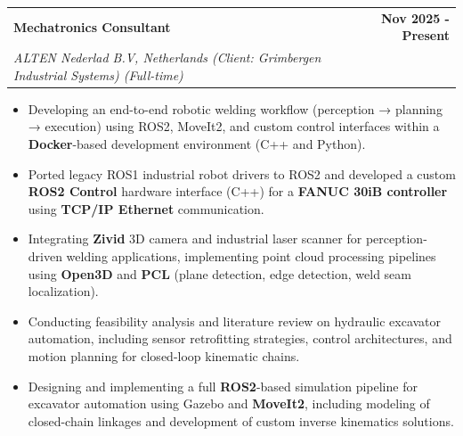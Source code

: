 \documentclass[a4paper,20pt]{article}
\makeatletter
\newcommand{\resumeSubheading}[4]{
  \vspace{-1pt}\item
    \begin{tabular*}{0.97\textwidth}{l@{\extracolsep{\fill}}r}
      \textbf{#1} \small \textit{#4} & #2 \\
      \textit{#3} &  \\
    \end{tabular*}\vspace{-5pt}
}
\newcommand{\resumeSubheading}[5]{ %
  \vspace{-1pt}\item
    \begin{tabular*}{0.97\textwidth}{l@{\extracolsep{\fill}}r}
      \textbf{#1} & #2 \\
      \textit{#3} & \textit{#4} \\
    \end{tabular*} 
    \vspace{-2pt}
    \small #5 %
    \vspace{-5pt}
}
\makeatother
\begin{document}
\vspace{5pt}
    \resumeSubheading
		{Mechatronics Consultant}{\textbf{Nov 2025 - Present}}{ALTEN Nederlad B.V, Netherlands  (Client: Grimbergen Industrial Systems) (Full-time) }{}
		\begin{itemize}
       \item Developing an end-to-end robotic welding workflow (perception → planning → execution) using ROS2, MoveIt2, and custom control interfaces within a \textbf{Docker}-based development environment (C++ and Python). \vspace{-2pt}
\item Ported legacy ROS1 industrial robot drivers to ROS2 and developed a custom \textbf{ROS2 Control} hardware interface (C++) for a \textbf{FANUC 30iB controller} using \textbf{TCP/IP Ethernet} communication. \vspace{-2pt}

\item Integrating \textbf{Zivid} 3D camera and industrial laser scanner for perception-driven welding applications, implementing point cloud processing pipelines using \textbf{Open3D} and \textbf{PCL} (plane detection, edge detection, weld seam localization). \vspace{-2pt}
 \vspace{2}
        \item Conducting feasibility analysis and literature review on hydraulic excavator automation, including sensor retrofitting strategies, control architectures, and motion planning for closed-loop kinematic chains. \vspace{-2pt}

\item Designing and implementing a full \textbf{ROS2}-based simulation pipeline for excavator automation using Gazebo and \textbf{MoveIt2}, including modeling of closed-chain linkages and development of custom inverse kinematics solutions. \vspace{-2pt}
\end{itemize}
\end{document}
